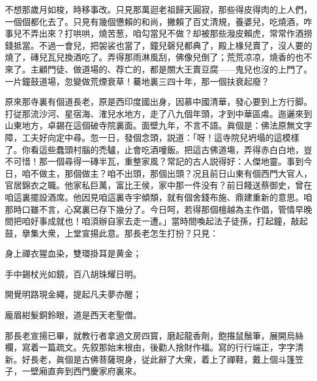 不想那歲月如梭，時移事改。只見那萬迴老祖歸天圓寂，那些得皮得肉的上人們，一個個都化去了。只見有幾個憊賴的和尚，撇賴了百丈清規，養婆兒，吃燒酒，咋事兒不弄出來？打哄哄，燒苦葱，咱勾當兒不做？却被那些潑皮賴虎，常常作酒撈錢抵當。不過一會兒，把袈裟也當了，鐘兒磬兒都典了，殿上椽兒賣了，沒人要的燒了，磚兒瓦兒換酒吃了。弄得那雨淋風刮，佛像兒倒了；荒荒凉凉，燒香的也不來了。主顧門徒、做道場的、荐亡的，都是關大王賣豆腐——鬼兒也沒的上門了。一片鐘鼓道場，忽變做荒煙衰草！驀地裏三四十年，那一個扶衰起廢？

原來那寺裏有個道長老，原是西印度國出身，因慕中國清華，發心要到上方行脚。打従那流沙河、星宿海、㴶兒水地方，走了八九個年頭，才到中華區䖏。迤邐來到山東地方，卓錫在這個破寺院裏面。面壁九年，不言不語。眞個是：佛法原無文字障，工夫好向定中尋。忽一日，發個念頭，説道：「呀！這寺院兒坍塌的這模樣了。你看這些蠢頭村腦的禿驢，止會吃酒噇飯。把這古佛道塲，弄得赤白白地，豈不可惜！那一個尋得一磚半瓦，重整家風？常記的古人説得好：人傑地靈。事到今日，咱不做主，那個做主？咱不出頭，那個出頭？况且前日山東有個西門大官人，官居錦衣之職。他家私巨萬，富比王侯，家中那一件没有？前日餞送蔡御史，曾在咱這裏擺設酒席。他因見咱這裏寺宇傾頽，就有個舍錢布施、鼎建重新的意思。咱那時口雖不言，心窝裏已存下幾分了。今日呵，若得那個檀越為主作倡，管情早晚間把咱好事成就也！咱湏辦自家去走一遭。」當時間喚起法子徒孫，打起鐘，敲起鼓，擧集大衆，上堂宣揚此意。那長老怎生打扮？只見：

身上禪衣猩血染，雙環掛耳是黄金；

手中錫杖光如鏡，百八胡珠耀日明。

開覺明路現金繩，提起凡夫夢亦醒；

龐眉紺髮銅鈴眼，道是西天老聖僧。

那長老宣揚已畢，就教行者拿過文房四寳，磨起龍香劑，飽揝鼠鬚筆，展開烏絲欄，寫着一篇疏文。先叙那始末根由，後勸人捨財作福。寫的行行端正，字字清新。好長老，眞個是古佛菩薩現身，従此辭了大衆，着上了禪鞋，戴上個斗篷笠子，一壁廂直奔到西門慶家府裏來。

